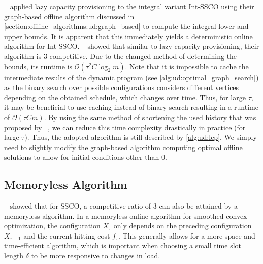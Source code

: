 \citeauthor*{Albers2018}~\cite{Albers2018} applied lazy capacity provisioning to the integral variant Int-SSCO using their graph-based offline algorithm discussed in \cref{section:offline_algorithms:ud:graph_based} to compute the integral lower and upper bounds. It is apparent that this immediately yields a deterministic online algorithm for Int-SSCO. \citeauthor*{Albers2018}~\cite{Albers2018} showed that similar to lazy capacity provisioning, their algorithm is $3$-competitive. Due to the changed method of determining the bounds, its runtime is $\mathcal{O}(\tau^2 C \log_2 m)$. Note that it is impossible to cache the intermediate results of the dynamic program (see \cref{alg:ud:optimal_graph_search}) as the binary search over possible configurations considers different vertices depending on the obtained schedule, which changes over time. Thus, for large $\tau$, it may be beneficial to use caching instead of binary search resulting in a runtime of $\mathcal{O}(\tau C m)$. By using the same method of shortening the used history that was proposed by \citeauthor*{Lin2011}~\cite{Lin2011}, we can reduce this time complexity drastically in practice (for large $\tau$). Thus, the adopted algorithm is still described by \cref{alg:ud:lcp}. We simply need to slightly modify the graph-based algorithm computing optimal offline solutions to allow for initial conditions other than $0$.

\subsection{Memoryless Algorithm}\label{section:online_algorithms:ud:memoryless}

\citeauthor*{Bansal2015}~\cite{Bansal2015} showed that for SSCO, a competitive ratio of $3$ can also be attained by a memoryless algorithm. In a memoryless online algorithm for smoothed convex optimization, the configuration $X_{\tau}$ only depends on the preceding configuration $X_{\tau-1}$ and the current hitting cost $f_{\tau}$. This generally allows for a more space and time-efficient algorithm, which is important when choosing a small time slot length $\delta$ to be more responsive to changes in load.

